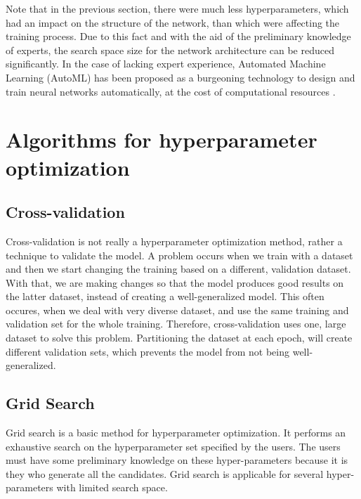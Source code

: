 \documentclass[conference]{IEEEtran}
\begin{document}
Note that in the previous section, there were much less hyperparameters, which had an impact on the structure of the network, than which were affecting the training process. Due to this fact and with the aid of the preliminary knowledge of experts, the search space size for the network architecture can be reduced significantly. In the case of lacking expert experience, Automated Machine Learning (AutoML) has been proposed as a burgeoning technology to design and train neural networks automatically, at the cost of computational resources \cite{yu2020hyperparameter}.


\section{Algorithms for hyperparameter optimization}
\subsection*{Cross-validation}
Cross-validation is not really a hyperparameter optimization method, rather a technique to validate the model. A problem occurs when we train with a dataset and then we start changing the training based on a different, validation dataset. With that, we are making  changes so that the model produces good results on the latter dataset, instead of creating a well-generalized model. This often occures, when we deal with very diverse dataset, and use the same training and validation set for the whole training. Therefore, cross-validation uses one, large dataset to solve this problem. Partitioning the dataset at each epoch, will create different validation sets, which prevents the model from not being well-generalized.


\subsection{Grid Search}
Grid search is a basic method for hyperparameter optimization. It performs an exhaustive search on the hyperparameter set specified by the users. The users must have some preliminary knowledge on these hyper-parameters because it is they who generate all the candidates. Grid search is applicable for several hyper-parameters with limited search space.
\end{document}
